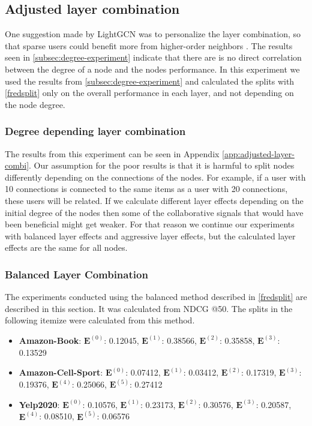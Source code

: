 \subsection{Adjusted layer combination}
One suggestion made by LightGCN was to personalize the layer combination, so that sparse users could benefit more from higher-order neighbors \cite{lightgcn}.
The results seen in \autoref{subsec:degree-experiment} indicate that there are is no direct correlation between the degree of a node and the nodes performance.
In this experiment we used the results from \autoref{subsec:degree-experiment} and calculated the splits with \autoref{fredsplit} only on the overall performance in each layer, and not depending on the node degree.

\subsubsection{Degree depending layer combination}
The results from this experiment can be seen in Appendix \ref{app:adjusted-layer-combi}.
Our assumption for the poor results is that it is harmful to split nodes differently depending on the connections of the nodes.
For example, if a user with 10 connections is connected to the same items as a user with 20 connections, these users will be related.
If we calculate different layer effects depending on the initial degree of the nodes then some of the collaborative signals that would have been beneficial might get weaker.
For that reason we continue our experiments with balanced layer effects and aggressive layer effects, but the calculated layer effects are the same for all nodes.

\subsubsection{Balanced Layer Combination}
The experiments conducted using the balanced method described in \autoref{fredsplit} are described in this section.
It was calculated from NDCG @50.
The splits in the following itemize were calculated from this method.
\begin{itemize}
    \item \textbf{Amazon-Book}: $\mathbf{E}^{(0)}$: 0.12045, $\mathbf{E}^{(1)}$: 0.38566, $\mathbf{E}^{(2)}$: 0.35858, $\mathbf{E}^{(3)}$:  0.13529
    \item \textbf{Amazon-Cell-Sport}: $\mathbf{E}^{(0)}$: 0.07412, $\mathbf{E}^{(1)}$: 0.03412, $\mathbf{E}^{(2)}$: 0.17319, $\mathbf{E}^{(3)}$:  0.19376, $\mathbf{E}^{(4)}$: 0.25066, $\mathbf{E}^{(5)}$: 0.27412
    \item \textbf{Yelp2020}: $\mathbf{E}^{(0)}$: 0.10576, $\mathbf{E}^{(1)}$: 0.23173, $\mathbf{E}^{(2)}$: 0.30576, $\mathbf{E}^{(3)}$: 0.20587, $\mathbf{E}^{(4)}$: 0.08510, $\mathbf{E}^{(5)}$: 0.06576
\end{itemize}

